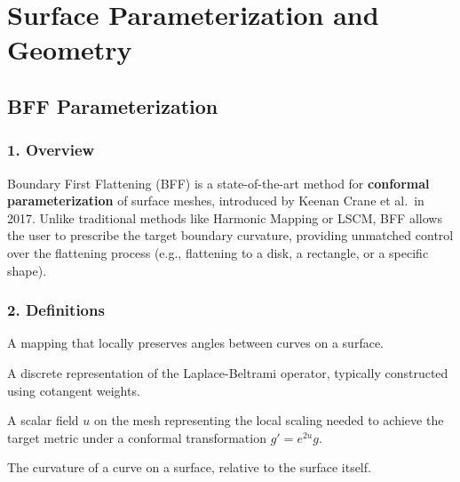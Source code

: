 \chapter{Surface Parameterization and Geometry}
\label{ch:surface_geometry}

\section{BFF Parameterization}
\label{sec:bff_parameterization}

\subsection{1. Overview}

Boundary First Flattening (BFF) is a state-of-the-art method for \textbf{conformal parameterization} of surface meshes, introduced by Keenan Crane et al.\ in 2017\cite{crane2017}. Unlike traditional methods like Harmonic Mapping or LSCM, BFF allows the user to prescribe the target boundary curvature, providing unmatched control over the flattening process (e.g., flattening to a disk, a rectangle, or a specific shape).

\subsection{2. Definitions}

\begin{definition}\label{def:conformal_mapping}
A mapping that locally preserves angles between curves on a surface.
\end{definition}

\begin{definition}\label{def:laplacian_matrix_bff}
A discrete representation of the Laplace-Beltrami operator, typically constructed using cotangent weights.
\end{definition}

\begin{definition}\label{def:scale_factor}
A scalar field $u$ on the mesh representing the local scaling needed to achieve the target metric under a conformal transformation $g' = e^{2u}g$.
\end{definition}

\begin{definition}\label{def:geodesic_curvature_bff}
The curvature of a curve on a surface, relative to the surface itself.
\end{definition}

